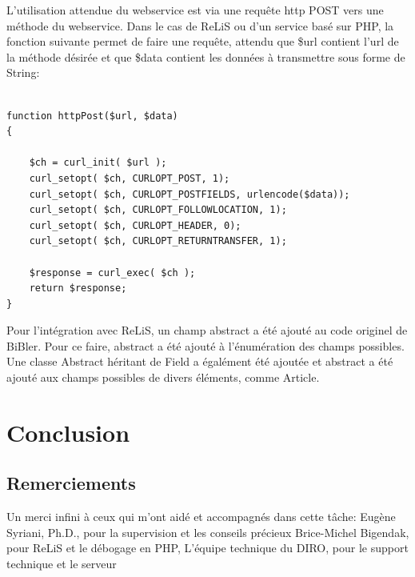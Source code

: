 \documentclass[a4paper,12pt,titlepage]{article}
\let\oldsection\section
\renewcommand\section{\clearpage\oldsection}
\begin{document}
L'utilisation attendue du webservice est via une requête http POST vers une méthode du webservice. Dans le cas de ReLiS ou d'un service basé sur PHP, la fonction suivante permet de faire une requête, attendu que \$url contient l'url de la méthode désirée et que \$data contient les données à transmettre sous forme de String: 
\begin{lstlisting}

function httpPost($url, $data)
{

	$ch = curl_init( $url );
	curl_setopt( $ch, CURLOPT_POST, 1);
	curl_setopt( $ch, CURLOPT_POSTFIELDS, urlencode($data));
	curl_setopt( $ch, CURLOPT_FOLLOWLOCATION, 1);
	curl_setopt( $ch, CURLOPT_HEADER, 0);
	curl_setopt( $ch, CURLOPT_RETURNTRANSFER, 1);

	$response = curl_exec( $ch );
    return $response;
}

\end{lstlisting}

Pour l'intégration avec ReLiS, un champ abstract a été ajouté au code originel de BiBler. Pour ce faire, abstract a été ajouté à l'énumération des champs possibles. Une classe Abstract héritant de Field a égalément été ajoutée et abstract a été ajouté aux champs possibles de divers éléments, comme Article.


\section{Conclusion}
\subsection{Remerciements}
Un merci infini à ceux qui m'ont aidé et accompagnés dans cette tâche: \newline
Eugène Syriani, Ph.D., pour la supervision et les conseils précieux\newline
Brice-Michel Bigendak, pour ReLiS et le débogage en PHP,
L'équipe technique du DIRO, pour le support technique et le serveur
{}

\end{document}
